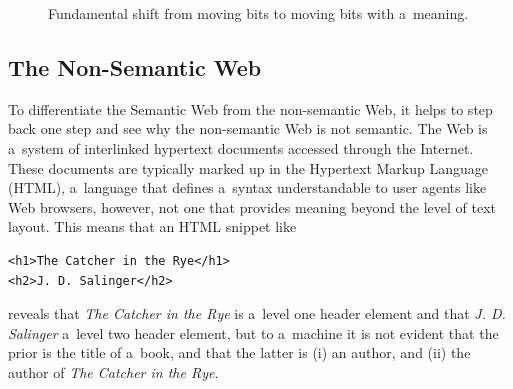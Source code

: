 \begin{figure}[h!]
\begin{center}
  \caption{Fundamental shift from moving bits to moving bits with a~meaning.}
  \label{fig:fundamental-shift}  
\end{center}    
\end{figure}

\subsection{The Non-Semantic Web} \label{sec:non-semantic-web}

To differentiate the Semantic Web from the non-semantic Web,
it helps to step back one step and
see why the non-semantic Web is not semantic.
The Web is a~system of interlinked hypertext documents
accessed through the Internet.
These documents are typically marked up in
the Hypertext Markup Language (HTML),
a~language that defines a~syntax
understandable to user agents like Web browsers,
however, not one that provides meaning
beyond the level of text layout.
This means that an HTML snippet like
\begin{verbatim}
<h1>The Catcher in the Rye</h1>
<h2>J. D. Salinger</h2>
\end{verbatim}
reveals that \emph{The Catcher in the Rye}
is a~level one header element and
that \emph{J. D. Salinger} a~level two header element,
but to a~machine it is not evident that the prior
is the title of a~book,
and that the latter is (i) an author, and (ii)
the author of \emph{The Catcher in the Rye}.

